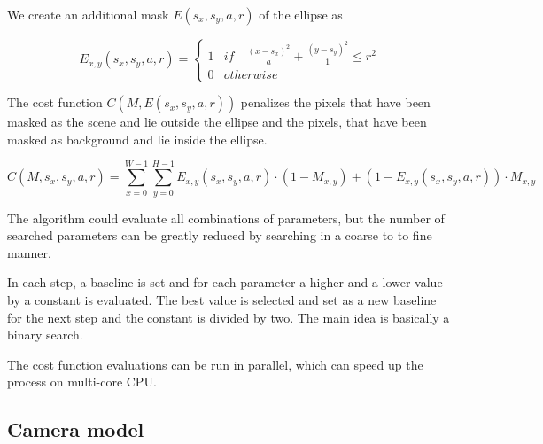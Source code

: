 \documentclass[a4paper,12pt,titlepage, twoside]{article}
\numberwithin{figure}{section}
\begin{document}
We create an additional mask $E(s_x, s_y, a, r)$ of the ellipse as 

\begin{equation*}
E_{x,y}(s_x, s_y, a, r) = \begin{cases}
1 & if \quad \frac{(x-s_x)^2}{a} + \frac{(y-s_y)^2}{1} \leq r^2 \\
0 & otherwise
\end{cases}
\end{equation*}

The cost function $C(M, E(s_x, s_y, a, r))$ penalizes the pixels that have been masked as the scene and lie outside the ellipse and the pixels, that have been masked as background and lie inside the ellipse.

\begin{equation}
C(M, s_x, s_y, a, r) = \sum_{x = 0}^{W-1} \sum_{y = 0}^{H-1} E_{x,y}(s_x, s_y, a, r) \cdot (1-M_{x,y}) + (1 - E_{x,y}(s_x, s_y, a, r)) \cdot M_{x,y}
\end{equation}

The algorithm could evaluate all combinations of parameters, but the number of searched parameters can be greatly reduced by searching in a coarse to to fine manner. 

In each step, a baseline is set and for each parameter a higher and a lower value by a constant is evaluated. The best value is selected and set as a new baseline for the next step and the constant is divided by two. The main idea is basically a binary search.


%
%
%    
%    
%    

The cost function evaluations can be run in parallel, which can speed up the process on multi-core CPU.

\subsection{Camera model}
\end{document}
